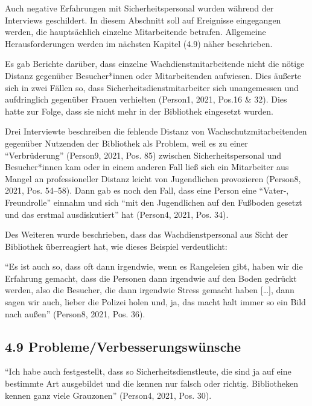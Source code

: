 \documentclass[a4paper,
fontsize=11pt,
oneside,
numbers=noperiodatend,
parskip=half-,
bibliography=totoc,
final
]{scrartcl}
\begin{document}
Auch negative Erfahrungen mit Sicherheitspersonal wurden während der
Interviews geschildert. In diesem Abschnitt soll auf Ereignisse
eingegangen werden, die hauptsächlich einzelne Mitarbeitende betrafen.
Allgemeine Herausforderungen werden im nächsten Kapitel (4.9) näher
beschrieben.

Es gab Berichte darüber, dass einzelne Wachdienstmitarbeitende nicht die
nötige Distanz gegenüber Besucher*innen oder Mitarbeitenden aufwiesen.
Dies äußerte sich in zwei Fällen so, dass Sicherheitsdienstmitarbeiter
sich unangemessen und aufdringlich gegenüber Frauen verhielten (Person1,
2021, Pos.16 \& 32). Dies hatte zur Folge, dass sie nicht mehr in der
Bibliothek eingesetzt wurden.

Drei Interviewte beschreiben die fehlende Distanz von
Wachschutzmitarbeitenden gegenüber Nutzenden der Bibliothek als Problem,
weil es zu einer \enquote{Verbrüderung} (Person9, 2021, Pos. 85)
zwischen Sicherheitspersonal und Besucher*innen kam oder in einem
anderen Fall ließ sich ein Mitarbeiter aus Mangel an professioneller
Distanz leicht von Jugendlichen provozieren (Person8, 2021, Pos.
54--58). Dann gab es noch den Fall, dass eine Person eine
\enquote{Vater-, Freundrolle} einnahm und sich \enquote{mit den
Jugendlichen auf den Fußboden gesetzt und das erstmal ausdiskutiert} hat
(Person4, 2021, Pos. 34).

Des Weiteren wurde beschrieben, dass das Wachdienstpersonal aus Sicht
der Bibliothek überreagiert hat, wie dieses Beispiel verdeutlicht:

\begin{flushright}
\enquote{Es ist auch so, dass oft dann irgendwie, wenn es Rangeleien
gibt, haben wir die Erfahrung gemacht, dass die Personen dann irgendwie
auf den Boden gedrückt werden, also die Besucher, die dann irgendwie
Stress gemacht haben {[}\ldots{]}, dann sagen wir auch, lieber die
Polizei holen und, ja, das macht halt immer so ein Bild nach außen}
\linebreak(Person8, 2021, Pos. 36).
\end{flushright}

\hypertarget{problemeverbesserungswuxfcnsche}{%
\subsection{4.9
Probleme/Verbesserungswünsche}\label{problemeverbesserungswuxfcnsche}}

\begin{flushright}
\enquote{Ich habe auch festgestellt, dass so Sicherheitsdienstleute, die
sind ja auf eine bestimmte Art ausgebildet und die kennen nur falsch
oder richtig. Bibliotheken kennen ganz viele Grauzonen} \linebreak(Person4, 2021,
Pos. 30).
\end{flushright}
\end{document}
